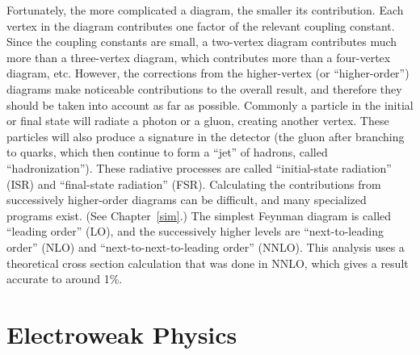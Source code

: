 Fortunately, the more complicated a diagram, 
the smaller its contribution.  
Each vertex in the diagram contributes 
one factor of the relevant coupling constant. 
Since the coupling constants are small, 
a two-vertex diagram contributes much more 
than a three-vertex diagram, 
which contributes more than a 
four-vertex diagram, etc.  
However, the corrections from the higher-vertex 
(or ``higher-order'') 
diagrams make noticeable contributions 
to the overall result, 
and therefore they should be taken into 
account as far as possible.  
Commonly a particle in the initial or final state 
will radiate a photon or a gluon, 
creating another vertex.  
These particles will also produce a signature 
in the detector 
(the gluon after branching to quarks, 
which then continue to form 
a ``jet'' of hadrons, 
called ``hadronization''). 
These radiative processes are called 
``initial-state radiation'' (ISR) and 
``final-state radiation'' (FSR).  
Calculating the contributions from 
successively higher-order diagrams 
can be difficult, %
and many specialized programs exist.  
(See Chapter~\ref{sim}.)  
The simplest Feynman diagram is called 
``leading order'' (LO), 
and the successively higher levels are 
``next-to-leading order'' (NLO) and 
``next-to-next-to-leading order'' (NNLO).  
This analysis uses a theoretical 
cross section calculation that 
was done in NNLO, 
which gives a result accurate to 
around 1\%.  



\section{Electroweak Physics}
\label{theory:EWK}



